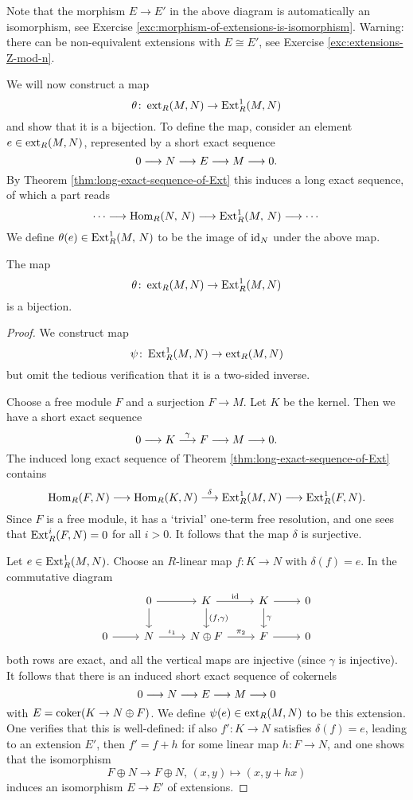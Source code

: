 Note that the morphism $E\to E'$ in the above diagram is automatically an isomorphism, see Exercise \ref{exc:morphism-of-extensions-is-isomorphism}. Warning: there can be non-equivalent extensions with $E\cong E'$, see Exercise \ref{exc:extensions-Z-mod-n}.


We will now construct a map
\[
	\theta\colon \operatorname{ext}_R(M,N) \to \operatorname{Ext}^1_R(M,N)
\]
and show that it is a bijection. To define the map, consider an element $e\in \operatorname{ext}_R(M,N)$, represented by a 
short exact sequence
\[
	0 \longrightarrow N \longrightarrow E \longrightarrow M \longrightarrow 0.
\]
By Theorem \ref{thm:long-exact-sequence-of-Ext} this induces a long exact sequence, of which a part reads
\[
	\cdots \longrightarrow \operatorname{Hom}_R(N,\, N) \longrightarrow \operatorname{Ext}^1_R(M,\,N) \longrightarrow \cdots
\]
We define $\theta(e) \in \operatorname{Ext}^1_R(M,\,N)$ to be the image of ${\rm id}_N$ under the above map. 

\begin{theorem}\label{thm:main-thm-ext}
The map
\[
	\theta\colon \operatorname{ext}_R(M,N) \to \operatorname{Ext}^1_R(M,N)
\]
is a bijection.
\end{theorem}

\begin{proof}
We construct map 
\[
	\psi\colon \operatorname{Ext}^1_R(M,N) \to \operatorname{ext}_R(M,N)
\]
but omit the tedious verification that it is a two-sided inverse.

Choose a free module $F$ and a surjection $F\to M$. Let $K$ be the kernel. Then we have a short exact sequence
\[
	0 \longrightarrow K \overset{\gamma}{\longrightarrow} F \longrightarrow M \longrightarrow 0.
\]
The induced long exact sequence of Theorem \ref{thm:long-exact-sequence-of-Ext} contains
\[
	\operatorname{Hom}_R(F,N) \longrightarrow \operatorname{Hom}_R(K,N) \overset{\delta}{\longrightarrow} \operatorname{Ext}^1_R(M,N) \longrightarrow \operatorname{Ext}^1_R(F,N).
\]
Since $F$ is a free module, it has a `trivial' one-term free resolution, and one sees that $\operatorname{Ext}^i_R(F,N)=0$ for all $i>0$. It follows that the map $\delta$ is surjective.

Let $e \in \operatorname{Ext}^1_R(M,N)$. Choose an $R$-linear map $f\colon K \to N$ with $\delta(f)=e$.
In the commutative diagram
\[
\begin{tikzcd}
& 0 \arrow{r} \arrow{d} 
	& K \arrow{r}{\id} \arrow{d}{(f,\gamma)} & K \arrow{r} \arrow{d}{\gamma} & 0 \\
0 \arrow{r} & N \arrow{r}{\iota_1} & N \oplus F \arrow{r}{\pi_2} & F \arrow{r} & 0
\end{tikzcd}
\]
both rows are exact, and all the vertical maps are injective (since $\gamma$ is injective). It follows that there is an induced short exact sequence of cokernels
\[
	 0 \longrightarrow N \longrightarrow E \longrightarrow M \longrightarrow 0
\]
with $E=\operatorname{coker}(K \to N\oplus F)$. We define $\psi(e)\in \operatorname{ext}_R(M,N)$ to be this extension. One verifies that this is well-defined: if also $f'\colon K\to N$ satisfies $\delta(f)=e$, leading to an extension $E'$, then $f'=f+h$ for some linear map $h\colon F\to N$, and one shows that the isomorphism
\[
	F\oplus N \to F\oplus N,\, (x,y) \mapsto (x,y+hx)
\]
induces an isomorphism $E\to E'$ of extensions.
\end{proof}



